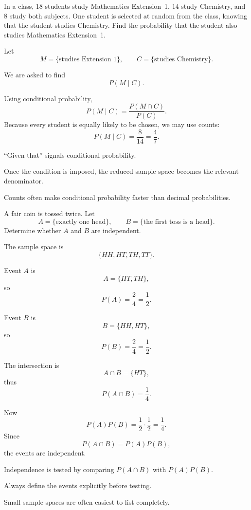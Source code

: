 \begin{problem}
In a class, $18$ students study Mathematics Extension~1, $14$ study Chemistry, and $8$ study both subjects. One student is selected at random from the class, knowing that the student studies Chemistry. Find the probability that the student also studies Mathematics Extension~1.
\end{problem}

\begin{solution}
Let
\[
M=\{\text{studies Extension~1}\},
\qquad
C=\{\text{studies Chemistry}\}.
\]

We are asked to find
\[
P(M\mid C).
\]

Using conditional probability,
\[
P(M\mid C)=\frac{P(M\cap C)}{P(C)}.
\]
Because every student is equally likely to be chosen, we may use counts:
\[
P(M\mid C)=\frac{8}{14}=\frac47.
\]
\end{solution}

\begin{takeaways}
\item ``Given that'' signals conditional probability.
\item Once the condition is imposed, the reduced sample space becomes the relevant denominator.
\item Counts often make conditional probability faster than decimal probabilities.
\end{takeaways}

\begin{problem}
A fair coin is tossed twice. Let
\[
A=\{\text{exactly one head}\},
\qquad
B=\{\text{the first toss is a head}\}.
\]
Determine whether $A$ and $B$ are independent.
\end{problem}

\begin{solution}
The sample space is
\[
\{HH,HT,TH,TT\}.
\]

Event $A$ is
\[
A=\{HT,TH\},
\]
so
\[
P(A)=\frac24=\frac12.
\]

Event $B$ is
\[
B=\{HH,HT\},
\]
so
\[
P(B)=\frac24=\frac12.
\]

The intersection is
\[
A\cap B=\{HT\},
\]
thus
\[
P(A\cap B)=\frac14.
\]

Now
\[
P(A)P(B)=\frac12\cdot\frac12=\frac14.
\]
Since
\[
P(A\cap B)=P(A)P(B),
\]
the events are independent.
\end{solution}

\begin{takeaways}
\item Independence is tested by comparing $P(A\cap B)$ with $P(A)P(B)$.
\item Always define the events explicitly before testing.
\item Small sample spaces are often easiest to list completely.
\end{takeaways}

